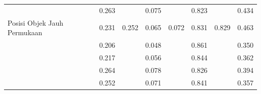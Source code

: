 \begin{table}[]
\begin{tabular}{|l|cc|cc|cc|c|}
                                                      & \multicolumn{1}{c|}{\cellcolor[HTML]{FFFFFF}0.263} & \cellcolor[HTML]{FFFFFF}                         & \multicolumn{1}{c|}{\cellcolor[HTML]{FFFFFF}0.075} & \cellcolor[HTML]{FFFFFF}                           & \multicolumn{1}{c|}{\cellcolor[HTML]{FFFFFF}0.823} & \cellcolor[HTML]{FFFFFF}                        & \multicolumn{1}{c|}{\cellcolor[HTML]{FFFFFF}0.434}   \\ \cline{2-2} \cline{4-4} \cline{6-6}
  \multirow{-5}{*}{Posisi Objek Jauh Permukaan}  & \multicolumn{1}{c|}{\cellcolor[HTML]{FFFFFF}0.231} & \multirow{-5}{*}{\cellcolor[HTML]{FFFFFF}0.252}  & \multicolumn{1}{c|}{\cellcolor[HTML]{FFFFFF}0.065} & \multirow{-5}{*}{\cellcolor[HTML]{FFFFFF}0.072}    & \multicolumn{1}{c|}{\cellcolor[HTML]{FFFFFF}0.831} & \multirow{-5}{*}{\cellcolor[HTML]{FFFFFF}0.829} & \multicolumn{1}{c|}{\cellcolor[HTML]{FFFFFF}0.463}   \\ \hline
                                                      & \multicolumn{1}{c|}{\cellcolor[HTML]{FFFFFF}0.206} & \cellcolor[HTML]{FFFFFF}                         & \multicolumn{1}{c|}{\cellcolor[HTML]{FFFFFF}0.048} & \cellcolor[HTML]{FFFFFF}                           & \multicolumn{1}{c|}{\cellcolor[HTML]{FFFFFF}0.861} & \cellcolor[HTML]{FFFFFF}                        & \multicolumn{1}{c|}{\cellcolor[HTML]{FFFFFF}0.350}   \\ \cline{2-2} \cline{4-4} \cline{6-6}
                                                      & \multicolumn{1}{c|}{\cellcolor[HTML]{FFFFFF}0.217} & \cellcolor[HTML]{FFFFFF}                         & \multicolumn{1}{c|}{\cellcolor[HTML]{FFFFFF}0.056} & \cellcolor[HTML]{FFFFFF}                           & \multicolumn{1}{c|}{\cellcolor[HTML]{FFFFFF}0.844} & \cellcolor[HTML]{FFFFFF}                        & \multicolumn{1}{c|}{\cellcolor[HTML]{FFFFFF}0.362}   \\ \cline{2-2} \cline{4-4} \cline{6-6}
                                                      & \multicolumn{1}{c|}{\cellcolor[HTML]{FFFFFF}0.264} & \cellcolor[HTML]{FFFFFF}                         & \multicolumn{1}{c|}{\cellcolor[HTML]{FFFFFF}0.078} & \cellcolor[HTML]{FFFFFF}                           & \multicolumn{1}{c|}{\cellcolor[HTML]{FFFFFF}0.826} & \cellcolor[HTML]{FFFFFF}                        & \multicolumn{1}{c|}{\cellcolor[HTML]{FFFFFF}0.394}   \\ \cline{2-2} \cline{4-4} \cline{6-6}
                                                      & \multicolumn{1}{c|}{\cellcolor[HTML]{FFFFFF}0.252} & \cellcolor[HTML]{FFFFFF}                         & \multicolumn{1}{c|}{\cellcolor[HTML]{FFFFFF}0.071} & \cellcolor[HTML]{FFFFFF}                           & \multicolumn{1}{c|}{\cellcolor[HTML]{FFFFFF}0.841} & \cellcolor[HTML]{FFFFFF}                        & \multicolumn{1}{c|}{\cellcolor[HTML]{FFFFFF}0.357}   \\ \cline{2-2} \cline{4-4} \cline{6-6}

\end{tabular}
\end{table}
